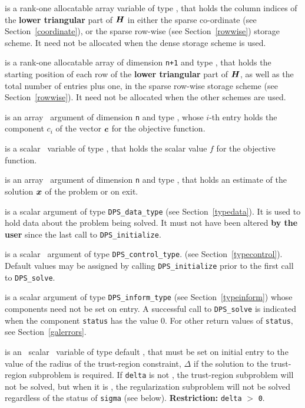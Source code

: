 \documentclass{galahad}
\newcommand{\packagename}{DPS}
\begin{document}
\begin{description}
\begin{description}
 is a rank-one allocatable array variable of type \integer,
that holds the column indices of the {\bf lower triangular} part of
${\bm{H}}$ in either the sparse co-ordinate
(see Section~\ref{coordinate}), or the sparse row-wise
(see Section~\ref{rowwise}) storage scheme.
It need not be allocated when the dense
storage scheme is used.

 is a rank-one allocatable array of dimension {\tt n+1} and type
\integer, that holds the starting position of
each row of the {\bf lower triangular} part of ${\bm{H}}$, as well
as the total number of entries plus one, in the sparse row-wise storage
scheme (see Section~\ref{rowwise}). It need not be allocated when the
other schemes are used.
\end{description}

 is an array \intentin\ argument of dimension {\tt n} and
type \realdp,  whose $i$-th entry holds the component $c_i$ of
the vector ${\bm{c}}$ for the objective function.

 is a scalar \intentin\ variable of type \realdp, that holds
the scalar value $f$ for the objective function.

 is an array \intentout\ argument of dimension {\tt n} and
type \realdp, that holds an estimate of the solution ${\bm{x}}$
of the problem  or  on exit.

 is a scalar \intentinout argument of type
{\tt \packagename\_data\_type}
(see Section~\ref{typedata}). It is used to hold data about the problem being
solved. It must not have been altered {\bf by the user} since the last call to
{\tt \packagename\_initialize}.

 is a scalar \intentin\ argument of type
{\tt \packagename\_control\_type}.
(see Section~\ref{typecontrol}).
Default values may be assigned by calling {\tt \packagename\_initialize}
prior to the first call to {\tt \packagename\_solve}.

 is a scalar \intentinout argument of type
{\tt \packagename\_inform\_type}
(see Section~\ref{typeinform}) whose components need not be set on entry.
A successful call to
{\tt \packagename\_solve}
is indicated when the  component {\tt status} has the value 0.
For other return values of {\tt status}, see Section~\ref{galerrors}.

 is an \optional\ scalar \intentin\ variable of type default
\realdp, that must be set on initial entry
to the value of the radius of the trust-region constraint, $\Delta$
if the solution to the trust-region subproblem  is required.
If {\tt delta} is not \present, the trust-region subproblem will not be
solved, but when it is \present, the regularization subproblem will not be
solved regardless of the status of {\tt sigma} (see below).
{\bf Restriction: } {\tt delta} $>$ {\tt 0}.


\end{description}
\end{document}
